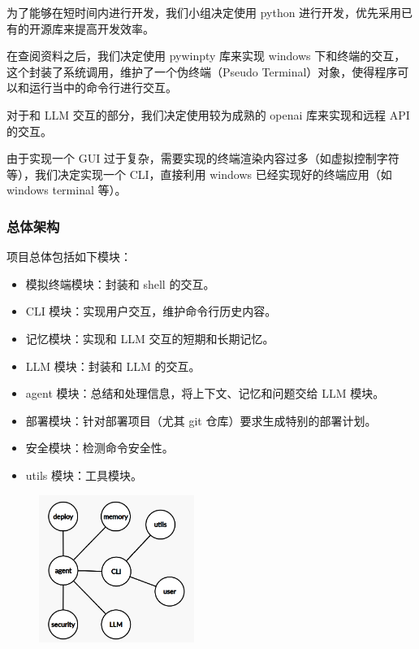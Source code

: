 \documentclass{article}
\theoremstyle{plain}
\theoremstyle{definition}
\theoremstyle{remark}
\begin{document}
为了能够在短时间内进行开发，我们小组决定使用 python 进行开发，优先采用已有的开源库来提高开发效率。

在查阅资料之后，我们决定使用 pywinpty 库来实现 windows 下和终端的交互，这个封装了系统调用，维护了一个伪终端（Pseudo Terminal）对象，使得程序可以和运行当中的命令行进行交互。

对于和 LLM 交互的部分，我们决定使用较为成熟的 openai 库来实现和远程 API 的交互。

由于实现一个 GUI 过于复杂，需要实现的终端渲染内容过多（如虚拟控制字符等），我们决定实现一个 CLI，直接利用 windows 已经实现好的终端应用（如 windows terminal 等）。

\subsubsection{总体架构}

项目总体包括如下模块：

\begin{itemize}
    \setlength{\itemsep}{0.1em}
    \setlength{\parskip}{0.1em}
    \item 模拟终端模块：封装和 shell 的交互。
    \item CLI 模块：实现用户交互，维护命令行历史内容。
    \item 记忆模块：实现和 LLM 交互的短期和长期记忆。
    \item LLM 模块：封装和 LLM 的交互。
    \item agent 模块：总结和处理信息，将上下文、记忆和问题交给 LLM 模块。
    \item 部署模块：针对部署项目（尤其 git 仓库）要求生成特别的部署计划。
    \item 安全模块：检测命令安全性。
    \item utils 模块：工具模块。
\end{itemize}

\begin{figure}[H]
\centering
\label{Structure}
\includegraphics[width=0.45\textwidth]{graph.png}
\end{figure}
\end{document}
